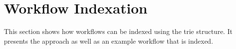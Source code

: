 \section{Workflow Indexation}
This section shows how workflows can be indexed using the trie structure. It presents the approach as well as an example workflow that is indexed.